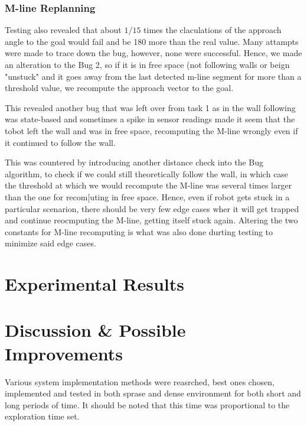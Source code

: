 \documentclass[11pt, a4paper]{article}
\begin{document}

\subsubsection{M-line Replanning}


Testing also revealed that about $1/15$ times the claculations of the approach angle to the goal would 
fail and be 180 \degree more than the real value. Many attampts were made to trace down the bug, however,
none were successful. Hence, we made an alteration to the Bug 2, so if it is in free space (not following 
walls or beign "unstuck"\cite{task1_report} and it goes away from the last detected m-line segment for more
than a threshold value, we recompute the approach vector to the goal.

This revealed another bug that was left over from task 1 as in the wall following was state-based and sometimes
a spike in sensor readings made it seem that the tobot left the wall and was in free space, recomputing the M-line
wrongly even if it continued to follow the wall. 


This was countered by introducing another distance check into the Bug algorithm, to check if we could still 
theoretically follow the wall, in which case the threshold at which we would recompute the M-line was several 
times larger than the one for recom[uting in free space. Hence, even if robot gets stuck in a particular scenarion, 
there should be very few edge cases wher it will get trapped and continue reocmputing the M-line, getting itself stuck again.
Altering the two constants for M-line recomputing is what was also done durting testing to minimize said edge cases.


\section{Experimental Results}
\label{Results}



\section{Discussion \& Possible Improvements}
\label{Results}


Various system implementation methods were reasrched, best ones chosen, implemented and 
tested in both sprase and dense environment for both short and long periods of time. It
should be noted that this time was proportional to the exploration time set.
\end{document}
